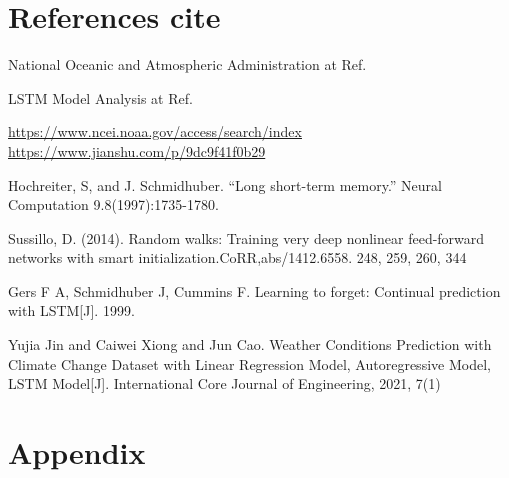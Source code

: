 \documentclass{swmcmthesis}
\begin{document}
\section{References cite}
\hspace{1.25em}
National Oceanic and Atmospheric Administration at Ref.\cite{bib:one}
\par 
LSTM Model Analysis at Ref.\cite{bib:two}




\begin{thebibliography}{9}%
     \url{https://www.ncei.noaa.gov/access/search/index}
     \url{https://www.jianshu.com/p/9dc9f41f0b29}

     Hochreiter, S, and J. Schmidhuber. “Long short-term memory.” Neural Computation 9.8(1997):1735-1780.

     Sussillo, D. (2014). Random walks: Training very deep nonlinear feed-forward networks with smart initialization.CoRR,abs/1412.6558. 248, 259, 260, 344

     Gers F A, Schmidhuber J, Cummins F. Learning to forget: Continual prediction with LSTM[J]. 1999.

     Yujia Jin and Caiwei Xiong and Jun Cao. Weather Conditions Prediction with Climate Change Dataset with Linear Regression Model, Autoregressive Model, LSTM Model[J]. International Core Journal of Engineering, 2021, 7(1)
\end{thebibliography}


\newpage

\section*{Appendix}
\end{document}
